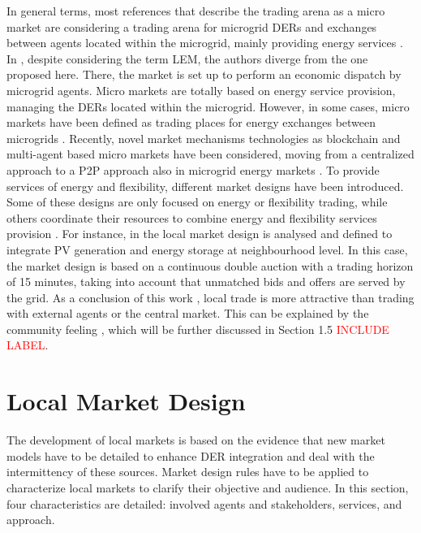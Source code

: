 In general terms, most references that describe the trading arena as a micro market are considering a trading arena for microgrid DERs and exchanges between agents located within the microgrid, mainly providing energy services \cite{faber2014micro, lane2013costing, block2008market, cox2011energy, sikdar2013microgrid, cui2014electricity, densmore2015energy, Heidari2018}. In \cite{shamsi2015economic}, despite considering the term LEM, the authors diverge from the one proposed here. There, the market is set up to perform an economic dispatch by microgrid agents. Micro markets are totally based on energy service provision, managing the DERs located within the microgrid. However, in some cases, micro markets have been defined as trading places for energy exchanges between microgrids \cite{menniti2014future}. Recently, novel market mechanisms technologies as blockchain and multi-agent based micro markets have been considered, moving from a centralized approach to a P2P approach also in microgrid energy markets \cite{Kounelis2017Fostering}. To provide services of energy and flexibility, different market designs have been introduced. Some of these designs are only focused on energy or flexibility trading, while others coordinate their resources to combine energy and flexibility services provision \cite{vytelingum2010trading, sikdar2013microgrid, Bayram2014}. For instance, in \cite{ampatzis2014local} the local market design is analysed and defined to integrate PV generation and energy storage at neighbourhood level. In this case, the market design is based on a continuous double auction with a trading horizon of 15 minutes, taking into account that unmatched bids and offers are served by the grid. As a conclusion of this work \cite{ampatzis2014local}, local trade is more attractive than trading with external agents or the central market. This can be explained by the community feeling \cite{Pinson2017}, which will be further discussed in Section 1.5 \textcolor{red}{INCLUDE LABEL}.

\section{Local Market Design}
The development of local markets is based on the evidence that new market models have to be detailed to enhance DER integration and deal with the intermittency of these sources. Market design rules have to be applied to characterize local markets to clarify their objective and audience. In this section, four characteristics are detailed: involved agents and stakeholders, services, and approach.

